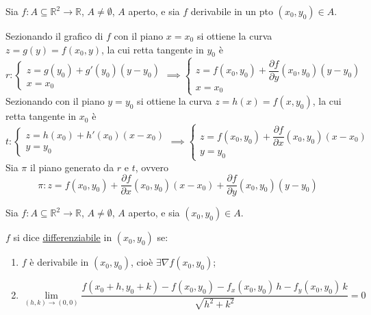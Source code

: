 \begin{oss}
Sia $f : A \subseteq \mathbb{R}^2 \to \mathbb{R}$, $A \neq \emptyset$, $A$ aperto, e sia $f$ derivabile in un pto $(x_0, y_0) \in A$.

Sezionando il grafico di $f$ con il piano $x = x_0$ si ottiene la curva $z = g(y) = f(x_0, y)$, la cui retta tangente in $y_0$ è
\[
r : \begin{cases}
z = g(y_0) + g'(y_0)(y - y_0) \\
x = x_0
\end{cases}
\implies
\begin{cases}
z = f(x_0, y_0) + \dfrac{\partial f}{\partial y}(x_0, y_0)(y - y_0) \\
x = x_0
\end{cases}
\]
Sezionando con il piano $y = y_0$ si ottiene la curva $z = h(x) = f(x, y_0)$, la cui retta tangente in $x_0$ è
\[
t : \begin{cases}
z = h(x_0) + h'(x_0)(x - x_0) \\
y = y_0
\end{cases}
\implies
\begin{cases}
z = f(x_0, y_0) + \dfrac{\partial f}{\partial x}(x_0, y_0)(x - x_0) \\
y = y_0
\end{cases}
\]
Sia $\pi$ il piano generato da $r$ e $t$, ovvero
\[
\boxed{\pi : z = f(x_0, y_0) + \frac{\partial f}{\partial x}(x_0, y_0)(x - x_0) + \frac{\partial f}{\partial y}(x_0, y_0)(y - y_0)}
\]
\end{oss}

\begin{definition}
Sia $f : A \subseteq \mathbb{R}^2 \to \mathbb{R}$, $A \neq \emptyset$, $A$ aperto, e sia $(x_0, y_0) \in A$.

$f$ si dice \underline{differenziabile} in $(x_0, y_0)$ se:
\begin{enumerate}
    \item $f$ è derivabile in $(x_0, y_0)$, cioè $\exists \nabla f(x_0, y_0)$;
    \item \[
    \lim_{(h, k) \to (0, 0)} \frac{f(x_0 + h, y_0 + k) - f(x_0, y_0) - f_x(x_0, y_0)\, h - f_y(x_0, y_0)\, k}{\sqrt{h^2 + k^2}} = 0
    \]
\end{enumerate}
\end{definition}

